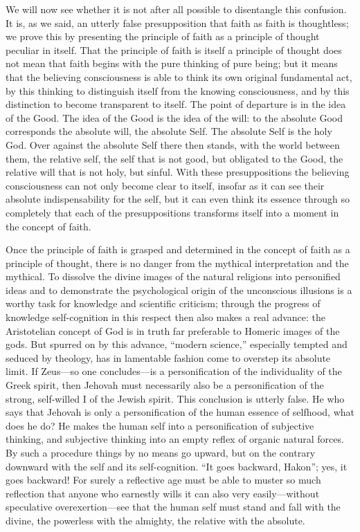 \documentclass[12pt]{book}
\newcommand{\opage}[1]{\marginnote{\footnotesize\textit{[#1]}}}
\begin{document}
We will now see whether it is not after all possible to disentangle this
confusion. It is, as we said, an utterly false presupposition that faith
as faith is thoughtless; we prove this by presenting the principle of
faith as a principle of thought peculiar in itself. That the principle
of faith is itself a principle of thought does not mean that faith
begins with the pure thinking of pure being; but it means that the
believing consciousness is able to think its own original fundamental
act, by this thinking to distinguish itself from the knowing
consciousness, and by this distinction to become transparent to itself.
The point of departure is in the idea of the Good. The idea of the Good
is the idea of the will: to the absolute Good corresponds the absolute
will, the absolute Self. The absolute Self is the holy God. Over against
the absolute Self there then stands, with the world between them, the
relative self, the self that is not good, but obligated to the Good, the
relative will that is not holy, but sinful. With these presuppositions
the believing consciousness can not only become
\opage{102}\setcounter{footnote}{0}%
clear to itself, insofar as it can see their absolute indispensability
for the self, but it can even think its essence through so completely
that each of the presuppositions transforms itself into a moment in the
concept of faith.

Once the principle of faith is grasped and determined in the concept of
faith as a principle of thought, there is no danger from the mythical
interpretation and the mythical. To dissolve the divine images of the
natural religions into personified ideas and to demonstrate the
psychological origin of the unconscious illusions is a worthy task for
knowledge and scientific criticism; through the progress of knowledge
self-cognition in this respect then also makes a real advance: the
Aristotelian concept of God is in truth far preferable to Homeric images
of the gods. But spurred on by this advance, ``modern science,''
especially tempted and seduced by theology, has in lamentable fashion
come to overstep its absolute limit. If Zeus---so one concludes---is a
personification of the individuality of the Greek spirit, then Jehovah
must necessarily also be a personification of the strong, self-willed I
of the Jewish spirit. This conclusion is utterly false. He who says
that Jehovah is only a personification of the human essence of selfhood,
what does he do? He makes the human self into a personification of
subjective thinking, and subjective thinking into an empty reflex of
organic natural forces. By such a procedure things by no means go
upward, but on the contrary downward with the self and its
self-cognition. ``It goes backward, Hakon''; yes, it goes backward! For
surely a reflective age must be able to muster so much reflection that
anyone who earnestly wills it can also very easily---without speculative
overexertion---see that the human self must stand and fall with the
divine, the
\opage{103}\setcounter{footnote}{0}%
powerless with the almighty, the relative with the absolute.
\end{document}
